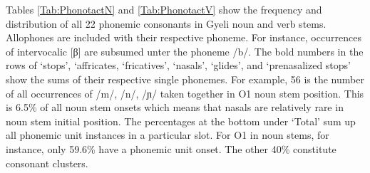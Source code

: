 Tables \ref{Tab:PhonotactN} and \ref{Tab:PhonotactV} show the frequency and distribution of all 22 phonemic consonants in Gyeli noun and verb stems. Allophones are included with their respective phoneme. For instance, occurrences of intervocalic [β] are subsumed unter the phoneme /b/. The bold numbers in the rows of `stops', `affricates,  `fricatives', `nasals', `glides', and `prenasalized stops' show the sums of their respective single phonemes. For example, 56 is the number of all occurrences of /m/, /n/, /ɲ/ taken together in O1 noun stem position. This is 6.5\% of all noun stem onsets which means that nasals are relatively rare in noun stem initial position.
The percentages at the bottom under `Total' sum up all phonemic unit instances in a particular slot. For O1 in noun stems, for instance, only 59.6\% have a phonemic unit onset. The other 40\% constitute consonant clusters.


